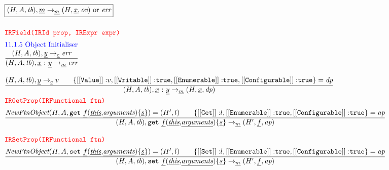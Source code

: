 


\[
\begin{array}{l@{~~}l@{~~}ll}
\fbox{$\evale,\ir{m} \rightarrow_{\ir{m}} (H, \irid, \emph{ov})$ or $\err$}\\[2em]
\mtt{\normalsize\inred IRField(IRId prop, IRExpr expr)}\\[.5em]
\mbox{\inblue 11.1.5 Object Initialiser}\\
\frac{\begin{matrix}
\evale, \ir{y} \rightarrow_{\ir\expr} \err
\end{matrix}}{\begin{matrix}
\evale, \irfield \rightarrow_{\ir{m}} \err
\end{matrix}}
\\\\

\frac{\begin{matrix}
\evale, \ir{y} \rightarrow_{\ir\expr} v
\rulesep
\{{\tt [[Value]]:} v,
{\tt [[Writable]]:} \true,
{\tt [[Enumerable]]:} \true,
{\tt [[Configurable]]:} \true\} = \emph{dp}
\end{matrix}}{\begin{matrix}
\evale, \irfield \rightarrow_{\ir{m}} (H, \irid, \emph{dp})
\end{matrix}}
\\[1em]

\mtt{\normalsize\inred IRGetProp(IRFunctional ftn)}\\[.5em]
\frac{\begin{matrix}
\hf{NewFtnObject}(H,A,\irget) = (H', l)
\rulesep
\{{\tt [[Get]]:} l,
{\tt [[Enumerable]]:} \true,
{\tt [[Configurable]]:} \true\} = \emph{ap}
\end{matrix}}{\begin{matrix}
\evale, \irget \rightarrow_{\ir{m}} (H', \ir{f}, \emph{ap})
\end{matrix}}
\\\\

\mtt{\normalsize\inred IRSetProp(IRFunctional ftn)}\\[.5em]
\frac{\begin{matrix}
\hf{NewFtnObject}(H,A,\irset) = (H', l)
\rulesep
\{{\tt [[Set]]:} l,
{\tt [[Enumerable]]:} \true,
{\tt [[Configurable]]:} \true\} = \emph{ap}
\end{matrix}}{\begin{matrix}
\evale, \irset \rightarrow_{\ir{m}} (H', \ir{f}, \emph{ap})
\end{matrix}}
\\\\


\end{array}
\]
